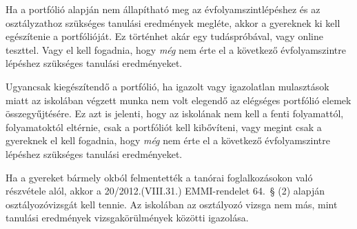 Ha a portfólió alapján nem állapítható meg az évfolyamszintlépéshez és
az osztályzathoz szükséges tanulási eredmények megléte, akkor a
gyereknek ki kell egészítenie a portfólióját. Ez történhet akár egy
tudáspróbával, vagy online teszttel. Vagy el kell fogadnia, hogy
\emph{még} nem érte el a következő évfolyamszintre lépéshez szükséges
tanulási eredményeket.

Ugyancsak kiegészítendő a portfólió, ha igazolt vagy igazolatlan
mulasztások miatt az iskolában végzett munka nem volt elegendő az
elégséges portfólió elemek összegyűjtésére. Ez azt is jelenti, hogy az
iskolának nem kell a fenti folyamattól, folyamatoktól eltérnie, csak a
portfóliót kell kibővíteni, vagy megint csak a gyereknek el kell
fogadnia, hogy \emph{még} nem érte el a következő évfolyamszintre
lépéshez szükséges tanulási eredményeket.

Ha a gyereket bármely okból felmentették a tanórai foglalkozásokon való
részvétele alól, akkor a 20/2012.(VIII.31.) EMMI-rendelet 64.~§ (2)
alapján osztályozóvizsgát kell tennie. Az iskolában az osztályozó vizsga
nem más, mint tanulási eredmények vizsgakörülmények közötti igazolása.
